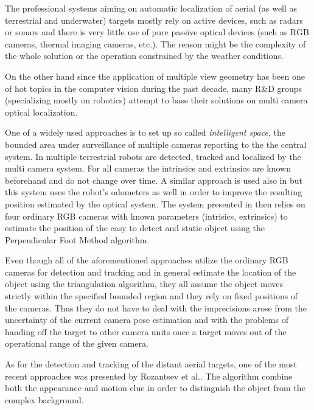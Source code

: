 The professional systems aiming on automatic localization of aerial (as well as terrestrial and underwater) targets mostly rely on active devices, such as radars or sonars and there is very little use of pure passive optical devices (such as RGB cameras, thermal imaging cameras, etc.). The reason might be the complexity of the whole solution or the operation constrained by the weather conditions.

On the other hand since the application of multiple view geometry has been one of hot topics in the computer vision during the past decade, many R\&D groups (specializing mostly on robotics) attempt to base their solutions on multi camera optical localization.

One of a widely used approaches is to set up so called \textit{intelligent space}\cite{intelligentSpace}, the bounded area under surveillance of multiple cameras reporting to the the central system. In \cite{Multi-Camera_Sensor_System_for_3D_Segmentation} multiple terrestrial robots are detected, tracked and localized by the multi camera system. For all cameras the intrinsics and extrinsics are known beforehand and do not change over time.  A similar approach is used also in \cite{Localization_and_Geometric_Reconstruction_of_Mobile_Robots} but this system uses the robot's odometers as well in order to improve the resulting position estimated by the optical system. The system presented in \cite{A_3D_visual_localization} then relies on four ordinary RGB cameras with known parameters (intrisics, extrinsics) to estimate the position of the easy to detect and static object using the Perpendicular Foot Method algorithm.

Even though all of the aforementioned approaches utilize the ordinary RGB cameras for detection and tracking and in general estimate the location of the object using the triangulation algorithm, they all assume the object moves strictly within the specified bounded region and they rely on fixed positions of the cameras. Thus they do not have to deal with the imprecisions arose from the uncertainty of the current camera pose estimation and with the problems of handing off the target to other camera units once a target moves out of the operational range of the given camera. 

As for the detection and tracking of the distant aerial targets, one of the most recent approaches was presented by Rozantsev et al.\cite{DBLP:journals/corr/RozantsevLF14}. The algorithm combine both the appearance and motion clue in order to distinguish the object from the complex background.

